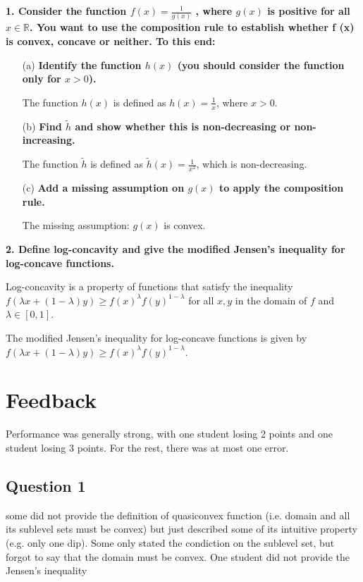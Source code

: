 \noindent\textbf{1. \; Consider the function $ f(x) = \frac{1} {g(x)}$ , where $g(x)$ is positive for all $x \in \mathbb{R}$. You want to use the composition rule to establish whether f (x) is convex, concave or neither. To this end:}
\begin{enumerate}
    \item[(a)] \textbf{Identify the function $h(x)$ (you should consider the function only for $x > 0$).}
    
    The function $h(x)$ is defined as $h(x) = \frac{1}{x}$, where $x > 0$.

    \item[(b)] \textbf{Find $\tilde{h}$ and show whether this is non-decreasing or non-increasing.}
    
    The function $\tilde{h}$ is defined as $\tilde{h}(x) = \frac{1}{x^2}$, which is non-decreasing.

    \item[(c)] \textbf{Add a missing assumption on $g(x)$ to apply the composition rule.}
    
    The missing assumption: $g(x)$ is convex.

\end{enumerate}

\noindent\textbf{2. \; Deﬁne log-concavity and give the modiﬁed Jensen's inequality for log-concave functions.}

Log-concavity is a property of functions that satisfy the inequality $f(\lambda x + (1-\lambda)y) \geq f(x)^\lambda f(y)^{1-\lambda}$ for all $x,y$ in the domain of $f$ and $\lambda \in [0,1]$.

The modified Jensen's inequality for log-concave functions is given by $f(\lambda x + (1-\lambda)y) \geq f(x)^\lambda f(y)^{1-\lambda}$.


\newpage
\section*{Feedback}

Performance was generally strong, with one student losing 2 points and one student losing 3 points. For the rest, there was at most one error.

\subsection*{Question 1}

some did not provide the definition of quasiconvex function (i.e. domain and all its sublevel sets must be convex) but just described some of its intuitive property (e.g. only one dip). Some only stated the condiction on the sublevel set, but forgot to say that the domain must be convex. One student did not provide the Jensen's inequality

